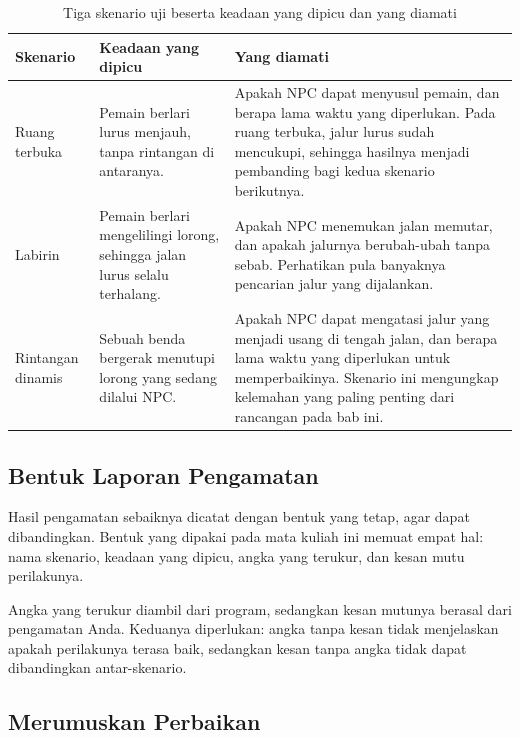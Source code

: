 \begin{table}[htbp]
\centering
\caption{Tiga skenario uji beserta keadaan yang dipicu dan yang diamati}
\label{tab:tiga-skenario}
{\setlength{\tabcolsep}{4pt}\footnotesize%
\begin{tabularx}{\textwidth}{@{}L{2.8cm} L{4.0cm} Y@{}}
\toprule
\headrow \textbf{Skenario} & \textbf{Keadaan yang dipicu} & \textbf{Yang diamati} \\
\midrule
Ruang terbuka &
Pemain berlari lurus menjauh, tanpa rintangan di antaranya. &
Apakah NPC dapat menyusul pemain, dan berapa lama waktu yang diperlukan.
Pada ruang terbuka, jalur lurus sudah mencukupi, sehingga hasilnya menjadi
pembanding bagi kedua skenario berikutnya. \\
\addlinespace
Labirin &
Pemain berlari mengelilingi lorong, sehingga jalan lurus selalu terhalang. &
Apakah NPC menemukan jalan memutar, dan apakah jalurnya berubah-ubah tanpa
sebab. Perhatikan pula banyaknya pencarian jalur yang dijalankan. \\
\addlinespace
Rintangan dinamis &
Sebuah benda bergerak menutupi lorong yang sedang dilalui NPC. &
Apakah NPC dapat mengatasi jalur yang menjadi usang di tengah jalan, dan
berapa lama waktu yang diperlukan untuk memperbaikinya. Skenario ini
mengungkap kelemahan yang paling penting dari rancangan pada bab ini. \\
\bottomrule
\end{tabularx}}
\end{table}

\subsection{Bentuk Laporan Pengamatan}

Hasil pengamatan sebaiknya dicatat dengan bentuk yang tetap, agar dapat
dibandingkan. Bentuk yang dipakai pada mata kuliah ini memuat empat hal:
nama skenario, keadaan yang dipicu, angka yang terukur, dan kesan mutu
perilakunya.

Angka yang terukur diambil dari program, sedangkan kesan mutunya berasal dari
pengamatan Anda. Keduanya diperlukan: angka tanpa kesan tidak menjelaskan
apakah perilakunya terasa baik, sedangkan kesan tanpa angka tidak dapat
dibandingkan antar-skenario.

\subsection{Merumuskan Perbaikan}

